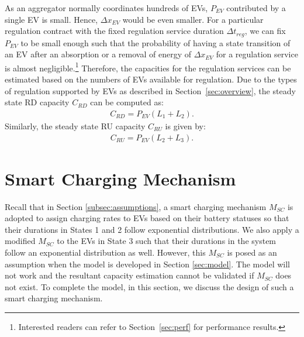 \documentclass[journal]{IEEEtran}
\begin{document}
As an aggregator normally coordinates hundreds of EVs, $P_{EV}$ contributed by
a single EV is small.  Hence, $\Delta x_{EV}$ would be even smaller.  For a
particular regulation contract with the fixed regulation service duration
$\Delta t_{reg}$, we can fix $P_{EV}$ to be small enough such that the
probability of having a state transition of an EV after an absorption or a
removal of energy of $\Delta x_{EV}$ for a regulation service is almost
negligible.\footnote{Interested readers can refer to Section~\ref{sec:perf}
for performance results.}  Therefore, the capacities for the regulation
services can be estimated based on the numbers of EVs available for regulation.
Due to the types of regulation supported by EVs as described in
Section~\ref{sec:overview}, the steady state RD capacity 
$C_{RD}$ can be computed as:
\begin{align}
C_{RD} = P_{EV}(L_1 + L_2).
\label{Crd}
\end{align}
Similarly, the steady state RU capacity $C_{RU}$ is given by:
\begin{align}
C_{RU} = P_{EV}(L_2 + L_3).
\label{Cru}
\end{align}


\section{Smart Charging Mechanism} \label{sec:scm}

Recall that in Section \ref{subsec:assumptions}, a smart charging mechanism $M_{SC}$ is adopted to assign charging rates to  EVs based on their battery statuses so that their durations in States 1 and 2 follow exponential distributions. We also apply a modified $M_{SC}$ to the EVs in State 3 such that their durations in the system follow an exponential distribution as well. 
However, this $M_{SC}$ is posed as an assumption when the model is developed in Section \ref{sec:model}. The model will not work and the resultant capacity estimation cannot be validated if $M_{SC}$ does not exist. To complete the model, in this section, we discuss the design of such a smart charging mechanism.
\end{document}
